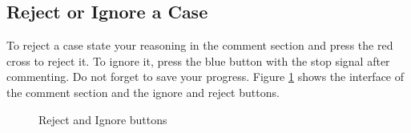 \documentclass{article}
\begin{document}
\subsection{Reject or Ignore a Case}
\label{reject-ignore-case}
To reject a case state your reasoning in the comment section and press the red cross to reject it. To ignore it, press the blue button with the stop signal after commenting. Do not forget to save your progress. Figure \ref{reject_ignore} shows the interface of the comment section and the ignore and reject buttons. 

\begin{figure}[h]
     \caption{Reject and Ignore buttons}
     \label{reject_ignore}
\end{figure}
\end{document}
